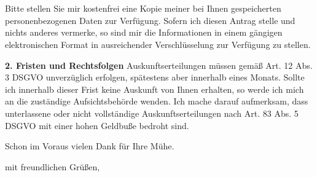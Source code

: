 \documentclass[a4paper, pagenumber=footmiddle, parskip=half,
	foldmarks=true,foldmarks=BmT, fromalign=right,
	fromphone=false, fromfax=false, fromemail=true, fromurl=false, fromlogo=false,
	fromrule=false, version=last]{scrlttr2}
\begin{document}
\begin{letter}{
	\EmpfaengerName\\
	\EmpfaengerStrasse\\
	\EmpfaengerStadt
}
Bitte stellen Sie mir kostenfrei eine Kopie meiner bei Ihnen gespeicherten personenbezogenen Daten zur Verfügung. Sofern ich diesen Antrag stelle und nichts anderes vermerke, so sind mir die Informationen in einem gängigen elektronischen Format in ausreichender Verschlüsselung zur Verfügung zu stellen.

\textbf{2. Fristen und Rechtsfolgen}
Auskunftserteilungen müssen gemäß Art. 12 Abs. 3 DSGVO unverzüglich erfolgen, spätestens aber innerhalb eines Monats. Sollte ich innerhalb dieser Frist keine Auskunft von Ihnen erhalten, so werde ich mich an die zuständige Aufsichtsbehörde wenden. Ich mache darauf aufmerksam, dass unterlassene oder nicht vollständige Auskunftserteilungen nach Art. 83 Abs. 5 DSGVO mit einer hohen Geldbuße bedroht sind.


Schon im Voraus vielen Dank für Ihre Mühe.

\closing{mit freundlichen Grüßen,}


\end{letter}
\end{document}
